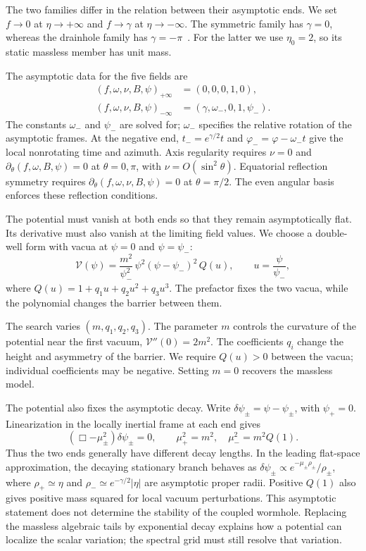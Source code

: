 \documentclass[twocolumn,floatfix,aps,prd,superscriptaddress,nofootinbib]{revtex4-2}
\begin{document}
The two families differ in the relation between their asymptotic ends. We set $f\to0$ at $\eta\to+\infty$ and $f\to\gamma$ at $\eta\to-\infty$. The symmetric family has $\gamma=0$, whereas the drainhole family has $\gamma=-\pi$~\cite{shirokov2026s}. For the latter we use $\eta_0=2$, so its static massless member has unit mass.

The asymptotic data for the five fields are
\begin{equation}
\begin{aligned}
(f,\omega,\nu,B,\psi)_{+\infty}&=(0,0,0,1,0),\\
(f,\omega,\nu,B,\psi)_{-\infty}&=(\gamma,\omega_-,0,1,\psi_-).
\end{aligned}
\label{eq:boundaries}
\end{equation}
The constants $\omega_-$ and $\psi_-$ are solved for; $\omega_-$ specifies
the relative rotation of the asymptotic frames. At the negative end,
$t_-=e^{\gamma/2}t$ and $\varphi_-=\varphi-\omega_-t$ give the local
nonrotating time and azimuth. Axis regularity requires $\nu=0$ and
$\partial_\theta(f,\omega,B,\psi)=0$ at $\theta=0,\pi$, with
$\nu=O(\sin^2\theta)$. Equatorial reflection symmetry requires
$\partial_\theta(f,\omega,\nu,B,\psi)=0$ at $\theta=\pi/2$.
The even angular basis enforces these reflection conditions.

The potential must vanish at both ends so that they remain asymptotically flat. Its derivative must also vanish at the limiting field values. We choose a double-well form with vacua at $\psi=0$ and $\psi=\psi_-$:
\begin{equation}
\mathcal{V}(\psi)=\frac{m^2}{\psi_-^2}\,\psi^2(\psi-\psi_-)^2\,Q(u),
\qquad u=\frac{\psi}{\psi_-},
\label{eq:kink}
\end{equation}
where $Q(u)=1+q_1u+q_2u^2+q_3u^3$. The prefactor fixes the two vacua, while the polynomial changes the barrier between them.

The search varies $(m,q_1,q_2,q_3)$. The parameter $m$ controls the curvature of the potential near the first vacuum, $\mathcal{V}''(0)=2m^2$. The coefficients $q_i$ change the height and asymmetry of the barrier. We require $Q(u)>0$ between the vacua; individual coefficients may be negative. Setting $m=0$ recovers the massless model.

The potential also fixes the asymptotic decay. Write
$\delta\psi_\pm=\psi-\psi_\pm$, with $\psi_+=0$. Linearization in the
locally inertial frame at each end gives
\begin{equation}
(\Box-\mu_\pm^2)\delta\psi_\pm=0,\qquad
\mu_+^2=m^2,\quad \mu_-^2=m^2Q(1).
\label{eq:yukawa}
\end{equation}
Thus the two ends generally have different decay lengths. In the leading
flat-space approximation, the decaying stationary branch behaves as
$\delta\psi_\pm\propto e^{-\mu_\pm\rho_\pm}/\rho_\pm$, where
$\rho_+\simeq\eta$ and $\rho_-\simeq e^{-\gamma/2}|\eta|$ are asymptotic
proper radii. Positive $Q(1)$ also gives positive mass squared for local
vacuum perturbations. This asymptotic statement does not determine the
stability of the coupled wormhole. Replacing the massless algebraic tails
by exponential decay explains how a potential can localize the scalar
variation; the spectral grid must still resolve that variation.
\end{document}
